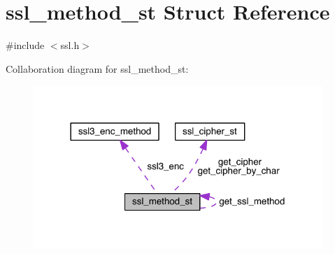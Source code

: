 \hypertarget{structssl__method__st}{}\section{ssl\+\_\+method\+\_\+st Struct Reference}
\label{structssl__method__st}


{\ttfamily \#include $<$ssl.\+h$>$}



Collaboration diagram for ssl\+\_\+method\+\_\+st\+:\nopagebreak
\begin{figure}[H]
\begin{center}
\leavevmode
\includegraphics[width=310pt]{structssl__method__st__coll__graph}
\end{center}
\end{figure}
